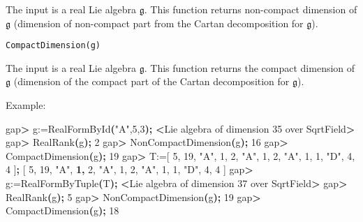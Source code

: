\documentclass[
]{article}
\newenvironment{Shaded}{\begin{snugshade}}{\end{snugshade}}
\newcommand{\BuiltInTok}[1]{#1}
\newcommand{\ErrorTok}[1]{\textcolor[rgb]{0.64,0.00,0.00}{\textbf{#1}}}
\newcommand{\ExtensionTok}[1]{#1}
\newcommand{\KeywordTok}[1]{\textcolor[rgb]{0.13,0.29,0.53}{\textbf{#1}}}
\newcommand{\NormalTok}[1]{#1}
\newcommand{\OperatorTok}[1]{\textcolor[rgb]{0.81,0.36,0.00}{\textbf{#1}}}
\newcommand{\StringTok}[1]{\textcolor[rgb]{0.31,0.60,0.02}{#1}}
\begin{document}
The input is a real Lie algebra \(\mathfrak{g}\). This function returns
non-compact dimension of \(\mathfrak{g}\) (dimension of non-compact part
from the Cartan decomposition for \(\mathfrak{g}\)).

\begin{verbatim}
CompactDimension(g)
\end{verbatim}

The input is a real Lie algebra \(\mathfrak{g}\). This function returns
the compact dimension of \(\mathfrak{g}\) (dimension of the compact part
of the Cartan decomposition for \(\mathfrak{g}\)).

Example:

\begin{Shaded}
\begin{Highlighting}[]
\ExtensionTok{gap}\OperatorTok{\textgreater{}}\NormalTok{ g:=RealFormById}\ErrorTok{(}\StringTok{"A"}\ExtensionTok{,5,3}\KeywordTok{);}
\OperatorTok{\textless{}}\NormalTok{Lie }\ExtensionTok{algebra}\NormalTok{ of dimension 35 over SqrtField}\OperatorTok{\textgreater{}}
\ExtensionTok{gap}\OperatorTok{\textgreater{}}\NormalTok{ RealRank}\ErrorTok{(}\ExtensionTok{g}\KeywordTok{);}
\ExtensionTok{2}
\ExtensionTok{gap}\OperatorTok{\textgreater{}}\NormalTok{ NonCompactDimension}\ErrorTok{(}\ExtensionTok{g}\KeywordTok{);}
\ExtensionTok{16}
\ExtensionTok{gap}\OperatorTok{\textgreater{}}\NormalTok{ CompactDimension}\ErrorTok{(}\ExtensionTok{g}\KeywordTok{);}
\ExtensionTok{19}
\ExtensionTok{gap}\OperatorTok{\textgreater{}}\NormalTok{ T:=[ 5, 19, }\StringTok{"A"}\NormalTok{, 1, 2, }\StringTok{"A"}\NormalTok{, 1, 2, }\StringTok{"A"}\NormalTok{, 1, 1, }\StringTok{"D"}\NormalTok{, 4, 4 ]}\KeywordTok{;}
\BuiltInTok{[}\NormalTok{ 5, 19, }\StringTok{"A"}\NormalTok{, }\ErrorTok{1,}\NormalTok{ 2, }\StringTok{"A"}\NormalTok{, 1, 2, }\StringTok{"A"}\NormalTok{, 1, 1, }\StringTok{"D"}\NormalTok{, 4, 4 ]}
\ExtensionTok{gap}\OperatorTok{\textgreater{}}\NormalTok{ g:=RealFormByTuple}\ErrorTok{(}\ExtensionTok{T}\KeywordTok{);}
\OperatorTok{\textless{}}\NormalTok{Lie }\ExtensionTok{algebra}\NormalTok{ of dimension 37 over SqrtField}\OperatorTok{\textgreater{}}
\ExtensionTok{gap}\OperatorTok{\textgreater{}}\NormalTok{ RealRank}\ErrorTok{(}\ExtensionTok{g}\KeywordTok{);}
\ExtensionTok{5}
\ExtensionTok{gap}\OperatorTok{\textgreater{}}\NormalTok{ NonCompactDimension}\ErrorTok{(}\ExtensionTok{g}\KeywordTok{);}
\ExtensionTok{19}
\ExtensionTok{gap}\OperatorTok{\textgreater{}}\NormalTok{ CompactDimension}\ErrorTok{(}\ExtensionTok{g}\KeywordTok{);}
\ExtensionTok{18}
\end{Highlighting}
\end{Shaded}
\end{document}
